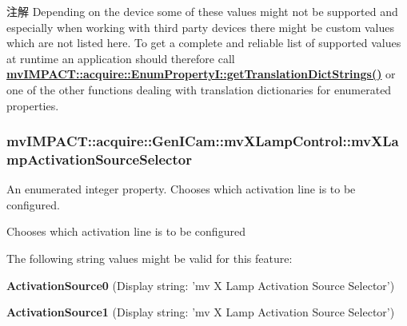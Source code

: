 \begin{DoxyNote}{注解}
Depending on the device some of these values might not be supported and especially when working with third party devices there might be custom values which are not listed here. To get a complete and reliable list of supported values at runtime an application should therefore call {\bfseries \hyperlink{classmv_i_m_p_a_c_t_1_1acquire_1_1_enum_property_i_a0ba6ccbf5ee69784d5d0b537924d26b6}{mv\+I\+M\+P\+A\+C\+T\+::acquire\+::\+Enum\+Property\+I\+::get\+Translation\+Dict\+Strings()}} or one of the other functions dealing with translation dictionaries for enumerated properties. 
\end{DoxyNote}
\hypertarget{classmv_i_m_p_a_c_t_1_1acquire_1_1_gen_i_cam_1_1mv_x_lamp_control_a46951da0aeda74f3f59b561078b965a8}{
\subsubsection[{mv\+X\+Lamp\+Activation\+Source\+Selector}]{ mv\+I\+M\+P\+A\+C\+T\+::acquire\+::\+Gen\+I\+Cam\+::mv\+X\+Lamp\+Control\+::mv\+X\+Lamp\+Activation\+Source\+Selector}}\label{classmv_i_m_p_a_c_t_1_1acquire_1_1_gen_i_cam_1_1mv_x_lamp_control_a46951da0aeda74f3f59b561078b965a8}


An enumerated integer property. Chooses which activation line is to be configured. 

Chooses which activation line is to be configured

The following string values might be valid for this feature\+:
\begin{DoxyItemize}
\item {\bfseries Activation\+Source0} (Display string\+: 'mv X Lamp Activation Source Selector')
\item {\bfseries Activation\+Source1} (Display string\+: 'mv X Lamp Activation Source Selector')
\end{DoxyItemize}

